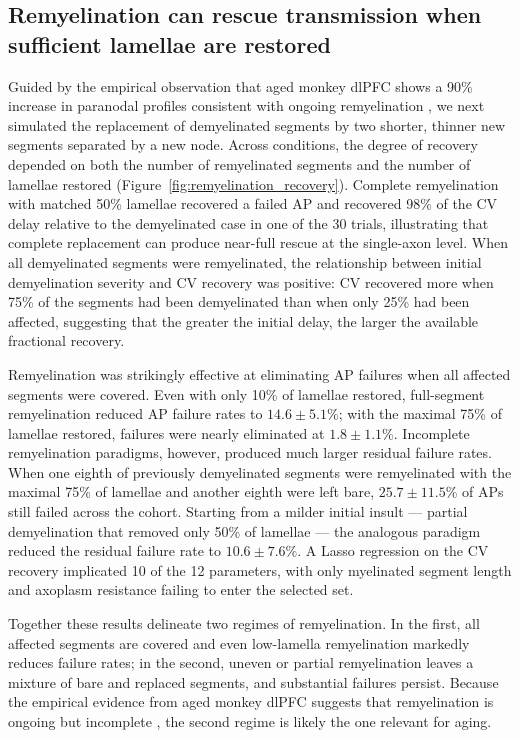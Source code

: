 \documentclass[11pt]{article}
\begin{document}
\subsection{Remyelination can rescue transmission when sufficient lamellae are restored}

Guided by the empirical observation that aged monkey dlPFC shows a 90\% increase in paranodal profiles consistent with ongoing remyelination \citep{peters2003remyelination}, we next simulated the replacement of demyelinated segments by two shorter, thinner new segments separated by a new node. Across conditions, the degree of recovery depended on both the number of remyelinated segments and the number of lamellae restored (Figure~\ref{fig:remyelination_recovery}). Complete remyelination with matched 50\% lamellae recovered a failed AP and recovered 98\% of the CV delay relative to the demyelinated case in one of the 30 trials, illustrating that complete replacement can produce near-full rescue at the single-axon level. When all demyelinated segments were remyelinated, the relationship between initial demyelination severity and CV recovery was positive: CV recovered more when 75\% of the segments had been demyelinated than when only 25\% had been affected, suggesting that the greater the initial delay, the larger the available fractional recovery.

Remyelination was strikingly effective at eliminating AP failures when all affected segments were covered. Even with only 10\% of lamellae restored, full-segment remyelination reduced AP failure rates to $14.6 \pm 5.1\%$; with the maximal 75\% of lamellae restored, failures were nearly eliminated at $1.8 \pm 1.1\%$. Incomplete remyelination paradigms, however, produced much larger residual failure rates. When one eighth of previously demyelinated segments were remyelinated with the maximal 75\% of lamellae and another eighth were left bare, $25.7 \pm 11.5\%$ of APs still failed across the cohort. Starting from a milder initial insult --- partial demyelination that removed only 50\% of lamellae --- the analogous paradigm reduced the residual failure rate to $10.6 \pm 7.6\%$. A Lasso regression on the CV recovery implicated 10 of the 12 parameters, with only myelinated segment length and axoplasm resistance failing to enter the selected set.

Together these results delineate two regimes of remyelination. In the first, all affected segments are covered and even low-lamella remyelination markedly reduces failure rates; in the second, uneven or partial remyelination leaves a mixture of bare and replaced segments, and substantial failures persist. Because the empirical evidence from aged monkey dlPFC suggests that remyelination is ongoing but incomplete \citep{peters2003remyelination,dimovasili2022oligodendrocyte}, the second regime is likely the one relevant for aging.
\end{document}
